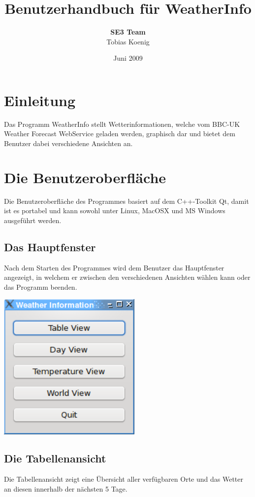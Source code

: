 \documentclass[11pt,a4paper]{scrreprt}
\begin{document}
\selectlanguage{\german}
\title{\LARGE Benutzerhandbuch für WeatherInfo}
\author{{\bf SE3 Team}\\Tobias Koenig}
\date{Juni 2009}

\maketitle

\tableofcontents

\chapter{Einleitung}
Das Programm WeatherInfo stellt Wetterinformationen, welche vom BBC-UK Weather Forecast
WebService geladen werden, graphisch dar und bietet dem Benutzer dabei verschiedene
Ansichten an.

\chapter{Die Benutzeroberfläche}
Die Benutzeroberfläche des Programmes basiert auf dem C++-Toolkit Qt, damit ist
es portabel und kann sowohl unter Linux, MacOSX und MS Windows ausgeführt werden.

\section{Das Hauptfenster}
Nach dem Starten des Programmes wird dem Benutzer das Hauptfenster angezeigt,
in welchem er zwischen den verschiedenen Ansichten wählen kann oder das
Programm beenden.

\begin{center}
\includegraphics[width=7cm]{mainwidget.png}
\end{center}

\section{Die Tabellenansicht}
Die Tabellenansicht zeigt eine Übersicht aller verfügbaren Orte und das
Wetter an diesen innerhalb der nächsten 5 Tage.
\end{document}
